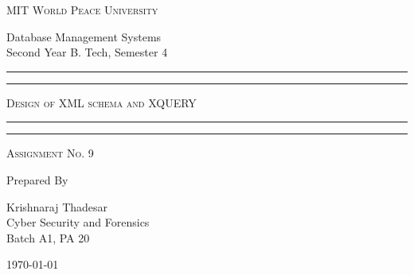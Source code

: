 \documentclass[11pt]{article}
\begin{document}
\begin{titlepage}
    \centering


    \huge\textsc{
        MIT World Peace University
    }\\

    \vspace{0.75\baselineskip} %

    \LARGE{
        Database Management Systems\\
        Second Year B. Tech, Semester 4
    }

    \vfill %


    \rule{\textwidth}{1.6pt}\vspace*{-\baselineskip}\vspace*{2pt}
    \rule{\textwidth}{0.6pt}
    \vspace{0.75\baselineskip} %



    \huge{\textsc{
            Design of XML schema and XQUERY
        }} \\



    \vspace{0.5\baselineskip} %
    \rule{\textwidth}{0.6pt}\vspace*{-\baselineskip}\vspace*{2.8pt}
    \rule{\textwidth}{1.6pt}

    \vspace{1\baselineskip} %


    \LARGE\textsc{
        Assignment No. 9
    } %
    \vfill


    Prepared By
    \vspace{0.5\baselineskip} %

    \Large{
        Krishnaraj Thadesar \\
        Cyber Security and Forensics\\
        Batch A1, PA 20
    }


    \vspace{0.5\baselineskip} %
    \today

\end{titlepage}
\end{document}
